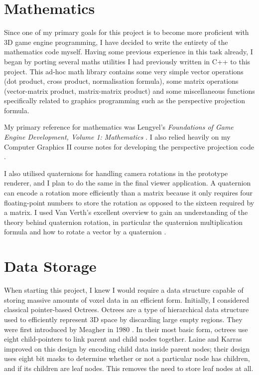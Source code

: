 \section{Mathematics}
Since one of my primary goals for this project is to become more proficient with 3D game engine programming, I have decided to write the entirety of the mathematics code myself. Having some previous experience in this task already, I began by porting several maths utilities I had previously written in C++ to this project. This ad-hoc math library contains some very simple vector operations (dot product, cross product, normalisation formula), some matrix operations (vector-matrix product, matrix-matrix product) and some miscellaneous functions specifically related to graphics programming such as the perspective projection formula.

My primary reference for mathematics was Lengyel's \textit{Foundations of Game Engine Development, Volume 1: Mathematics} \autocite{lengyel2016math}. I also relied heavily on my Computer Graphics II course notes for developing the perspective projection code \autocite{healy2019perspective}.

I also utilised quaternions for handling camera rotations in the prototype renderer, and I plan to do the same in the final viewer application. A quaternion can encode a rotation more efficiently than a matrix because it only requires four floating-point numbers to store the rotation as opposed to the sixteen required by a matrix. I used Van Verth's excellent overview to gain an understanding of the theory behind quaternion rotation, in particular the quaternion multiplication formula and how to rotate a vector by a quaternion \autocite{van2013understanding}.

\section{Data Storage}
When starting this project, I knew I would require a data structure capable of storing massive amounts of voxel data in an efficient form. Initially, I considered classical pointer-based Octrees. Octrees are a type of hierarchical data structure used to efficiently represent 3D space by discarding large empty regions. They were first introduced by Meagher in 1980 \autocite{meagher1980octree}. In their most basic form, octrees use eight child-pointers to link parent and child nodes together. Laine and Karras improved on this design by encoding child data inside parent nodes; their design uses eight bit masks to determine whether or not a particular node has children, and if its children are leaf nodes. This removes the need to store leaf nodes at all.


